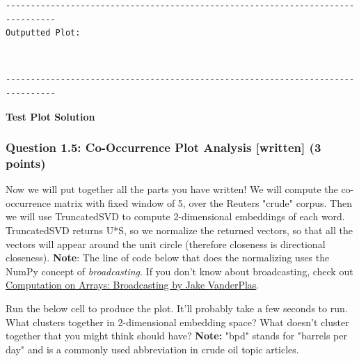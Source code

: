 \documentclass[11pt]{article}
\begin{document}
    \begin{Verbatim}[commandchars=\\\{\}]
--------------------------------------------------------------------------------
Outputted Plot:

    \end{Verbatim}

    \begin{center}
    \end{center}
    { \hspace*{\fill} \\}
    
    \begin{Verbatim}[commandchars=\\\{\}]
--------------------------------------------------------------------------------

    \end{Verbatim}

    \textbf{Test Plot Solution} 

    \subsubsection{Question 1.5: Co-Occurrence Plot Analysis {[}written{]}
(3
points)}\label{question-1.5-co-occurrence-plot-analysis-written-3-points}

Now we will put together all the parts you have written! We will compute
the co-occurrence matrix with fixed window of 5, over the Reuters
"crude" corpus. Then we will use TruncatedSVD to compute 2-dimensional
embeddings of each word. TruncatedSVD returns U*S, so we normalize the
returned vectors, so that all the vectors will appear around the unit
circle (therefore closeness is directional closeness). \textbf{Note}:
The line of code below that does the normalizing uses the NumPy concept
of \emph{broadcasting}. If you don't know about broadcasting, check out
\href{https://jakevdp.github.io/PythonDataScienceHandbook/02.05-computation-on-arrays-broadcasting.html}{Computation
on Arrays: Broadcasting by Jake VanderPlas}.

Run the below cell to produce the plot. It'll probably take a few
seconds to run. What clusters together in 2-dimensional embedding space?
What doesn't cluster together that you might think should have?
\textbf{Note:} "bpd" stands for "barrels per day" and is a commonly used
abbreviation in crude oil topic articles.
\end{document}
